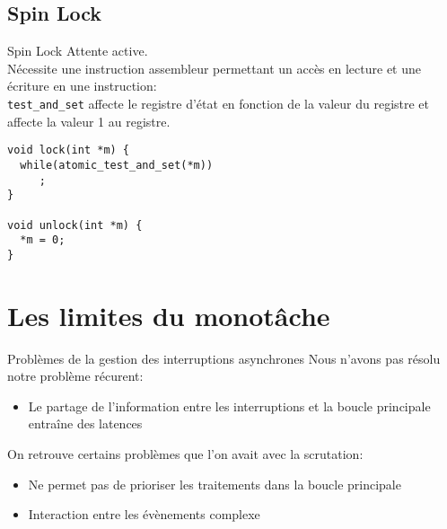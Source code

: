 \subsection{Spin Lock}

\begin{frame}[fragile]{Spin Lock}
  Attente active.\\
  Nécessite une instruction assembleur  permettant un accès en lecture
  et une écriture  en une instruction: \\
  \texttt{test\_and\_set} affecte le registre d'état en fonction de la
  valeur  du registre  et affecte  la valeur  1 au  registre.
  \begin{lstlisting}
void lock(int *m) {
  while(atomic_test_and_set(*m))
     ;
}

void unlock(int *m) {
  *m = 0;
}
  \end{lstlisting}
\end{frame}

\section{Les limites du monotâche}

\begin{frame}{Problèmes de la gestion des interruptions asynchrones}
  Nous n'avons pas résolu notre problème récurent:
  \begin{itemize}
  \item  Le partage  de l'information  entre les  interruptions  et la
    boucle principale entraîne des latences
  \end{itemize}
  On retrouve certains problèmes que l'on avait avec la scrutation:
  \begin{itemize}
  \item  Ne permet  pas de  prioriser  les traitements  dans la  boucle
    principale
  \item Interaction entre les évènements complexe
  \end{itemize}
\end{frame}

